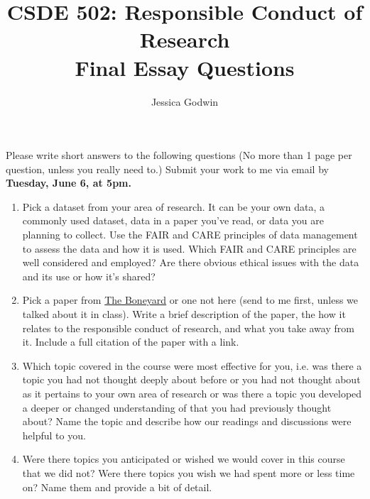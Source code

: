 \documentclass[11pt]{article}
\title{CSDE 502: Responsible Conduct of Research\\ Final Essay Questions}
\author{Jessica Godwin}
\begin{document}
\maketitle

\noindent Please write short answers to the following questions (No more than 1 page per question, unless you really need to.) Submit your work to me via email by \textbf{Tuesday, June 6, at 5pm.}

\begin{enumerate}
\item Pick a dataset from your area of research. It can be your own data, a commonly used dataset, data in a paper you've read, or data you are planning to collect. Use the FAIR and CARE principles of data management to assess the data and how it is used. Which FAIR and CARE principles are well considered and employed? Are there obvious ethical issues with the data and its use or how it's shared? 
\item Pick a paper from \href{https://jlgodwin.github.io/CSDE502-Sp23/#boneyard}{The Boneyard} or one not here (send to me first, unless we talked about it in class). Write a brief description of the paper, the how it relates to the responsible conduct of research, and what you take away from it. Include a full citation of the paper with a link.
\item Which topic covered in the course were most effective for you, i.e. was there a topic you had not thought deeply about before or you had not thought about as it pertains to your own area of research or was there a topic you developed a deeper or changed understanding of that you had previously thought about? Name the topic and describe how our readings and discussions were helpful to you.
\item Were there topics you anticipated or wished we would cover in this course that we did not? Were there topics you wish we had spent more or less time on? Name them and provide a bit of detail.
\end{enumerate}
\end{document}
